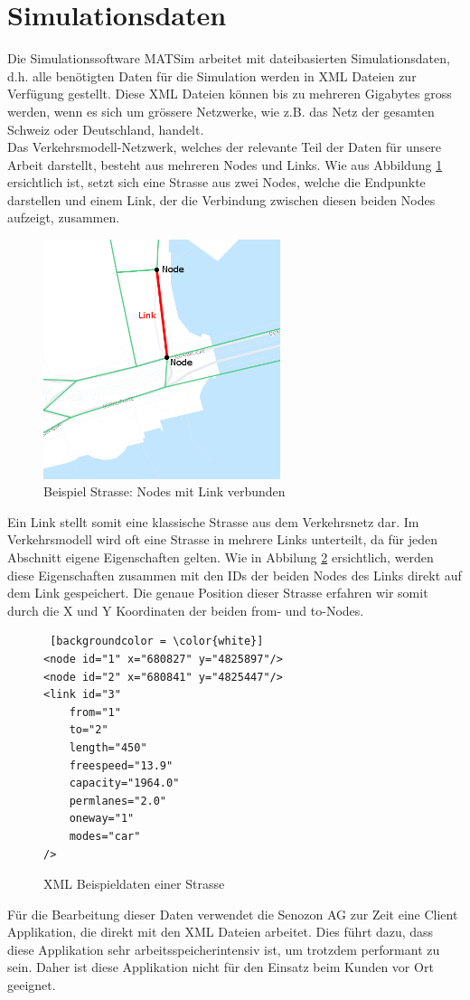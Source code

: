 \section{Simulationsdaten}
Die Simulationssoftware MATSim arbeitet mit dateibasierten Simulationsdaten, d.h. alle benötigten Daten für die Simulation werden in XML Dateien zur Verfügung gestellt. Diese XML Dateien können bis zu mehreren Gigabytes gross werden, wenn es sich um grössere Netzwerke, wie z.B. das Netz der gesamten Schweiz oder Deutschland, handelt.\\
Das Verkehrsmodell-Netzwerk, welches der relevante Teil der Daten für unsere Arbeit darstellt, besteht aus mehreren Nodes und Links. Wie aus Abbildung \ref{example_street} ersichtlich ist, setzt sich eine Strasse aus zwei Nodes, welche die Endpunkte darstellen und einem Link, der die Verbindung zwischen diesen beiden Nodes aufzeigt, zusammen.
\begin{figure}[H]
\centering
\includegraphics[height=7cm]{images/Link_demo_edited.PNG}
\caption{Beispiel Strasse: Nodes mit Link verbunden}
\label{example_street}
\end{figure}
\noindent
Ein Link stellt somit eine klassische Strasse aus dem Verkehrsnetz dar. Im Verkehrsmodell wird oft eine Strasse in mehrere Links unterteilt, da für jeden Abschnitt eigene Eigenschaften gelten. Wie in Abbilung \ref{street_details} ersichtlich, werden diese Eigenschaften zusammen mit den IDs der beiden Nodes des Links direkt auf dem Link gespeichert. Die genaue Position dieser Strasse erfahren wir somit durch die X und Y Koordinaten der beiden \glqq{}from\grqq{}- und \glqq{}to\grqq{}-Nodes.
\begin{figure}[H]
\centering
\lstset{language=XML}
\begin{lstlisting} [backgroundcolor = \color{white}]
<node id="1" x="680827" y="4825897"/>
<node id="2" x="680841" y="4825447"/>
<link id="3" 
	from="1" 
	to="2" 
	length="450" 
	freespeed="13.9" 
	capacity="1964.0" 
	permlanes="2.0" 
	oneway="1" 
	modes="car"
/>
\end{lstlisting}
\caption{XML Beispieldaten einer Strasse}
\label{street_details}
\end{figure}
\noindent
Für die Bearbeitung dieser Daten verwendet die Senozon AG zur Zeit eine Client Applikation, die direkt mit den XML Dateien arbeitet. Dies führt dazu, dass diese Applikation sehr arbeitsspeicherintensiv ist, um trotzdem performant zu sein. Daher ist diese Applikation nicht für den Einsatz beim Kunden vor Ort geeignet.
